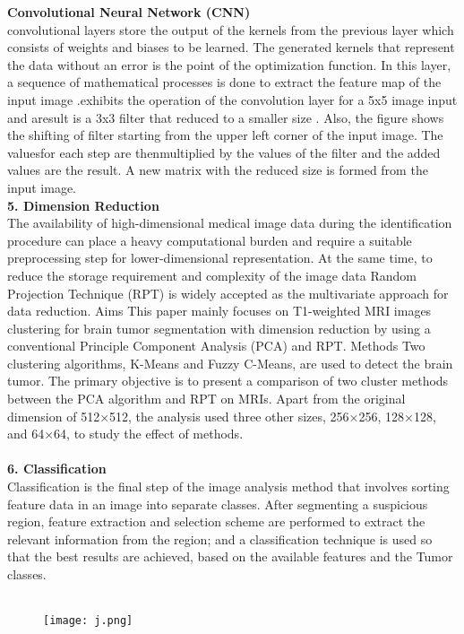 \documentclass{article}
\begin{document}
\textbf{Convolutional Neural Network (CNN)}\\
convolutional layers store the output of the kernels from the previous layer which consists of
weights and biases to be learned. The generated kernels that represent the data without an error is
the point of the optimization function. In this layer, a sequence of mathematical processes is done
to extract the feature map of the input image .exhibits the operation of the convolution layer for a
5x5 image input and aresult is a 3x3 filter that reduced to a smaller size . Also, the figure shows
the shifting of filter starting from the upper left corner of the input image. The valuesfor each step
are thenmultiplied by the values of the filter and the added values are the result. A new matrix
with the reduced size is formed from the input image.\\
\textbf{5. Dimension Reduction}\\
 The availability of high-dimensional medical image data during the identification procedure can place
a heavy computational burden and require a suitable preprocessing step for lower-dimensional
representation. At the same time, to reduce the storage requirement and complexity of the image data
Random Projection Technique (RPT) is widely accepted as the multivariate approach for data
reduction. Aims This paper mainly focuses on T1-weighted MRI images clustering for brain tumor
segmentation with dimension reduction by using a conventional Principle Component Analysis (PCA)
and RPT. Methods Two clustering algorithms, K-Means and Fuzzy C-Means, are used to detect the
brain tumor. The primary objective is to present a comparison of two cluster methods between the
PCA algorithm and RPT on MRIs. Apart from the original dimension of 512×512, the analysis used
three other sizes, 256×256, 128×128, and 64×64, to study the effect of methods.\\\\
\textbf{6. Classification}\\
Classification is the final step of the image analysis method that involves sorting feature data in an
image into separate classes. After segmenting a suspicious region, feature extraction and selection
scheme are performed to extract the relevant information from the region; and a classification
technique is used so that the best results are achieved, based on the available features and the Tumor
classes.\\\\ \begin{figure}[h]
            \centering
            \texttt{[image: j.png]}
        \end{figure}\\\\
\end{document}
